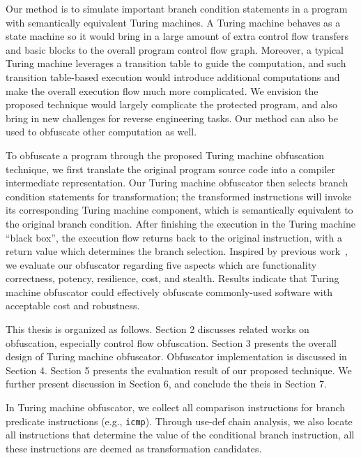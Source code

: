 Our method is to simulate important branch condition statements in a
program with semantically equivalent Turing machines. A Turing machine
behaves as a state machine so it would bring in a large amount of extra control
flow transfers and basic blocks to the overall program control flow graph.
Moreover, a typical Turing machine leverages a transition table to guide the
computation, and such transition table-based execution would introduce
additional computations and make the overall execution flow much more
complicated. We envision the proposed technique would largely complicate the
protected program, and also bring in new challenges for reverse engineering
tasks. Our method can also be used to obfuscate other computation as well.

To obfuscate a program through the proposed Turing machine obfuscation
technique, we first translate the original program source code into a compiler
intermediate representation. Our Turing machine obfuscator then selects branch
condition statements for transformation; the transformed instructions will invoke its
corresponding Turing machine component, which is semantically equivalent to the
original branch condition. After finishing the execution in the Turing machine
``black box'', the execution flow returns back to the original instruction, with
a return value which determines the branch selection. Inspired by previous
work~\cite{Collberg}, we evaluate our obfuscator regarding five aspects which
are functionality correctness, potency, resilience, cost, and stealth. Results
indicate that Turing machine obfuscator could effectively obfuscate
commonly-used software with acceptable cost and robustness.

This thesis is organized as follows. Section 2 discusses related works on
obfuscation, especially control flow obfuscation. Section 3 presents the overall
design of Turing machine obfuscator. Obfuscator implementation is discussed in
Section 4. Section 5 presents the evaluation result of our proposed technique.
We further present discussion in Section 6, and conclude the theis in Section 7.



In Turing machine obfuscator, we collect all comparison instructions for branch
predicate instructions (e.g., \texttt{icmp}). Through use-def chain analysis,
we also locate all instructions that determine the value of the conditional
branch instruction, all these instructions are deemed as transformation
candidates.